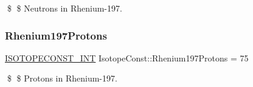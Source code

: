 \$ \$ Neutrons in Rhenium-\/197. \mbox{\label{group___isotope_const-_rhenium-_re197_gacc36880dd60e13301955f898cf1982f2}} 
\subsubsection{\texorpdfstring{Rhenium197\+Protons}{Rhenium197Protons}}
{\footnotesize\ttfamily \mbox{\hyperlink{group___isotope_const-_macros_ga5f18360b3e99483a35c32d789e62621c}{I\+S\+O\+T\+O\+P\+E\+C\+O\+N\+S\+T\+\_\+\+I\+NT}} Isotope\+Const\+::\+Rhenium197\+Protons = 75}

\$ \$ Protons in Rhenium-\/197. 